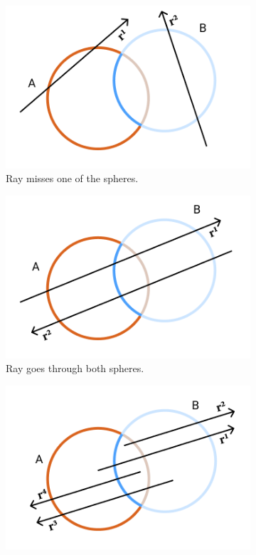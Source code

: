 \documentclass[a4paper,11pt,oneside]{article}
\begin{document}
\begin{figure}[ht]
	\centering
	\begin{subfigure}[b]{0.3\textwidth}
		\centering
		\includegraphics[width=\textwidth]{section3/3.4/difference-case-2.png}
		\caption{Ray misses one of the spheres.}
		\label{sec3.4:difference-case-1}
	\end{subfigure}
	\hfill
	\begin{subfigure}[b]{0.3\textwidth}
		\centering
		\includegraphics[width=\textwidth]{section3/3.4/difference-case-1.png}
		\caption{Ray goes through both spheres.}
		\label{sec3.4:difference-case-2}
	\end{subfigure}
	\hfill
	\begin{subfigure}[b]{0.3\textwidth}
		\centering
		\includegraphics[width=\textwidth]{section3/3.4/difference-case-3.png}

\end{subfigure}
\end{figure}
\end{document}

